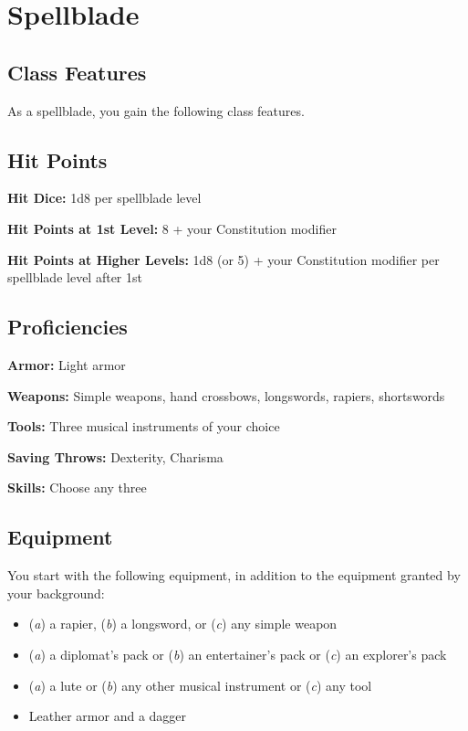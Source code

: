 \section{Spellblade}

\subsection{Class Features}

As a spellblade, you gain the following class features.

\subsection{Hit Points}

\textbf{Hit Dice:} 1d8 per spellblade level

\textbf{Hit Points at 1st Level:} 8 + your Constitution modifier

\textbf{Hit Points at Higher Levels:} 1d8 (or 5) + your Constitution modifier per spellblade level after 1st

\subsection{Proficiencies}

\textbf{Armor:} Light armor

\textbf{Weapons:} Simple weapons, hand crossbows, longswords, rapiers, shortswords

\textbf{Tools:} Three musical instruments of your choice

\textbf{Saving Throws:} Dexterity, Charisma

\textbf{Skills:} Choose any three

\subsection{Equipment}

You start with the following equipment, in addition to the equipment granted by your background:

\begin{itemize}
\item (\textit{a}) a rapier, (\textit{b}) a longsword, or (\textit{c}) any simple weapon
\item (\textit{a}) a diplomat’s pack or (\textit{b}) an entertainer’s pack or (\textit{c}) an explorer's pack
\item (\textit{a}) a lute or (\textit{b}) any other musical instrument or (\textit{c}) any tool
\item Leather armor and a dagger
\end{itemize}

